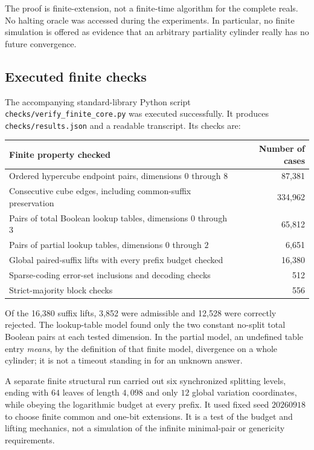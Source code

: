 \documentclass[11pt,a4paper]{article}
\newcommand{\code}[1]{\texttt{#1}}
\theoremstyle{definition}\newtheorem{definition}[theorem]{Definition}
\theoremstyle{remark}\newtheorem{remark}[theorem]{Remark}
\begin{document}
The proof is finite-extension, not a finite-time algorithm for the complete
reals. No halting oracle was accessed during the experiments. In particular,
no finite simulation is offered as evidence that an arbitrary partiality
cylinder really has no future convergence.

\subsection{Executed finite checks}
The accompanying standard-library Python script
\code{checks/verify\_finite\_core.py} was executed successfully. It produces
\code{checks/results.json} and a readable transcript. Its checks are:
\begin{center}
\begin{tabularx}{\textwidth}{@{}Xr@{}}
\toprule
Finite property checked & Number of cases\\
\midrule
Ordered hypercube endpoint pairs, dimensions $0$ through $8$ & 87,381\\
Consecutive cube edges, including common-suffix preservation & 334,962\\
Pairs of total Boolean lookup tables, dimensions $0$ through $3$ & 65,812\\
Pairs of partial lookup tables, dimensions $0$ through $2$ & 6,651\\
Global paired-suffix lifts with every prefix budget checked & 16,380\\
Sparse-coding error-set inclusions and decoding checks & 512\\
Strict-majority block checks & 556\\
\bottomrule
\end{tabularx}
\end{center}
Of the 16,380 suffix lifts, 3,852 were admissible and 12,528 were correctly
rejected. The lookup-table model found only the two constant no-split total
Boolean pairs at each tested dimension. In the partial model, an undefined
table entry \emph{means}, by the definition of that finite model, divergence
on a whole cylinder; it is not a timeout standing in for an unknown answer.

A separate finite structural run carried out six synchronized splitting
levels, ending with $64$ leaves of length $4,098$ and only $12$ global
variation coordinates, while obeying the logarithmic budget at every prefix.
It used fixed seed $20260918$ to choose finite common and one-bit extensions.
It is a test of the budget and lifting mechanics, not a simulation of the
infinite minimal-pair or genericity requirements.
\end{document}
